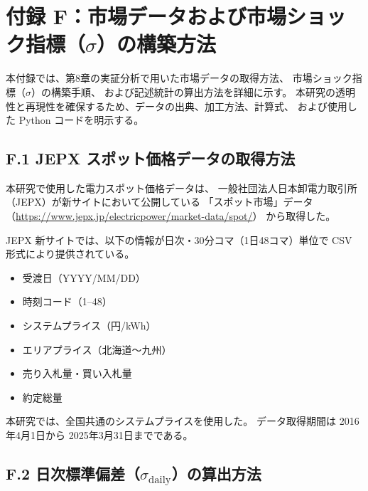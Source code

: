 %

\chapter*{付録 F：市場データおよび市場ショック指標（$\sigma$）の構築方法}

本付録では、第8章の実証分析で用いた市場データの取得方法、
市場ショック指標（$\sigma$）の構築手順、
および記述統計の算出方法を詳細に示す。
本研究の透明性と再現性を確保するため、データの出典、加工方法、計算式、
および使用した Python コードを明示する。

\section*{F.1 JEPX スポット価格データの取得方法}

本研究で使用した電力スポット価格データは、
一般社団法人日本卸電力取引所（JEPX）が新サイトにおいて公開している
「スポット市場」データ
（\url{https://www.jepx.jp/electricpower/market-data/spot/}）
から取得した。

JEPX 新サイトでは、以下の情報が日次・30分コマ（1日48コマ）単位で
CSV 形式により提供されている。

\begin{itemize}
  \item 受渡日（YYYY/MM/DD）
  \item 時刻コード（1--48）
  \item システムプライス（円/kWh）
  \item エリアプライス（北海道〜九州）
  \item 売り入札量・買い入札量
  \item 約定総量
\end{itemize}

本研究では、全国共通のシステムプライスを使用した。
データ取得期間は 2016年4月1日から 2025年3月31日までである。

\section*{F.2 日次標準偏差（$\sigma_{\mathrm{daily}}$）の算出方法}

